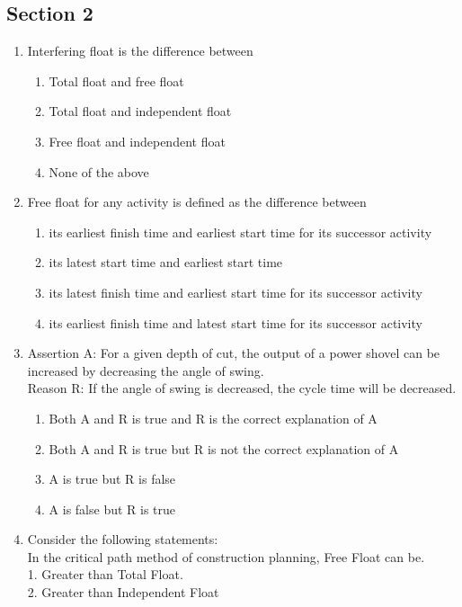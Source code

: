 \documentclass[11pt,a4paper]{article}
\begin{document}
\subsection*{Section 2}
\begin{enumerate}
\item{Interfering float is the difference between}
\begin{enumerate}[label=\Alph*.]
\item{Total float and free float}
\item{Total float and independent float}
\item{Free float and independent float}
\item{None of the above}
\end{enumerate}
\item{Free float for any activity is defined as the difference between}
\begin{enumerate}[label=\Alph*.]
\item{its earliest finish time and earliest start time for its successor activity}
\item{its latest start time and earliest start time}
\item{its latest finish time and earliest start time for its successor activity}
\item{its earliest finish time and latest start time for its successor activity}
\end{enumerate}
\item{Assertion A: For a given depth of cut, the output of a power shovel can be increased by decreasing the angle of swing. \\
Reason R: If the angle of swing is decreased, the cycle time will be decreased.}
\begin{enumerate}[label=\Alph*.]
\item{Both A and R is true and R is the correct explanation of A}
\item{Both A and R is true but R is not the correct explanation of A}
\item{A is true but R is false}
\item{A is false but R is true}
\end{enumerate}
\item{Consider the following statements:  \\
 In the critical path method of construction planning, Free Float can be. \\
 1. Greater than Total Float. \\
 2. Greater than Independent Float \\
}
\end{enumerate}
\end{document}
